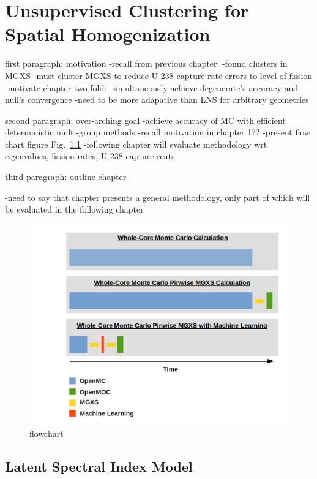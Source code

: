 \chapter{Unsupervised Clustering for Spatial Homogenization}
\label{chap:unsupervised}

first paragraph: motivation
-recall from previous chapter:
  -found clusters in \ac{MGXS}
  -must cluster \ac{MGXS} to reduce U-238 capture rate errors to level of fission
-motivate chapter two-fold:
  -simultaneously achieve degenerate's accuracy and null's convergence
  -need to be more adapative than \ac{LNS} for arbitrary geometries

second paragraph: over-arching goal
-achieve accuracy of \ac{MC} with efficient deterministic multi-group methods
-recall motivation in chapter 1??
-present flow chart figure Fig.~\ref{fig:chap10-flow-chart}
-following chapter will evaluate methodology wrt eigenvalues, fission rates, U-238 capture reats

third paragraph: outline chapter
-

-need to say that chapter presents a general methodology, only part of which will be evaluated in the following chapter

\begin{figure}
  \centering
  \includegraphics[width=0.9\linewidth]{figures/pipeline/flow-chart}
  \caption{}
\caption[flowchar]{flowchart}
\label{fig:chap10-flow-chart}
\end{figure}
  

\section{Latent Spectral Index Model}
\label{sec:chap10-latent-model}

